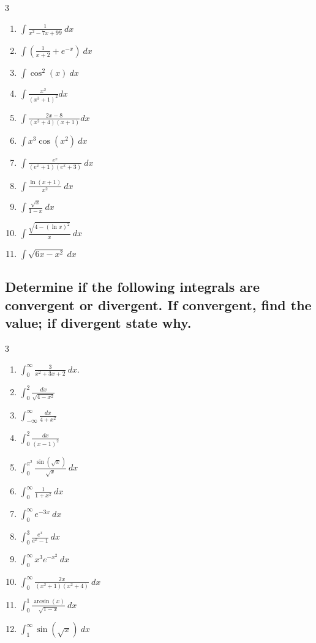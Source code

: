 \documentclass{article}
\begin{document}
\begin{multicols}{3}
\begin{enumerate}
\item $\displaystyle \int \frac{1}{x^2-7x+99}\ d x$
\item $\displaystyle \int\left( \frac{1}{x+2}+e^{-x}\right)\ d x$
\item $\displaystyle \int\cos^2(x)\ d x$
\item $\displaystyle \int\frac{x^2}{(x^3+1)^2} d x$
\item $\displaystyle \int\frac{2x-8}{(x^2+4)(x+1)} d x$
\item $\displaystyle \int x^3\cos(x^2)\ dx$
\item $\displaystyle \int \frac{e^x}{(e^x+1)(e^x+3)}\ dx$
\item $\displaystyle \int \frac{\ln(x+1)}{x^2}\ dx$
\item $\displaystyle \int \frac{\sqrt{x}}{1-x}\ dx$
\item $\displaystyle \int \frac{\sqrt{4-(\ln x)^2}}{x}\ dx$
\item $\displaystyle \int \sqrt{6x-x^2}\ dx$
\end{enumerate}
\end{multicols}


\subsection{Determine if the following integrals are convergent or divergent. If convergent, find the value; if divergent state why.}

\begin{multicols}{3}
\begin{enumerate}
\setlength{\itemsep}{0pt}
\item $\displaystyle \int_0^{\infty} \frac{3}{x^2+3x+2}\ dx$.
\item $\displaystyle \int_0^2 \frac{d x}{\sqrt{4-x^2}}$
\item $\displaystyle \int_{-\infty}^{\infty} \frac{d x}{4+x^2}$
\item $\displaystyle \int_0^2 \frac{d x}{(x-1)^2}$
\item $\displaystyle \int_0^{\pi^2} \frac{\sin (\sqrt{x})}{\sqrt{x}}\ d x$
\item $\displaystyle \int_0^{\infty} \frac{1}{1+x^2} \ d x$
\item $\displaystyle \int_0^{\infty} e^{-3x} \ d x$
\item $\displaystyle \int_0^{3} \frac{e^x}{e^x-1} \ d x$
\item $\displaystyle \int_0^{\infty} x^3 e^{-x^2}\ dx$
\item $\displaystyle \int_0^{\infty} \frac{2x}{(x^2+1)(x^2+4)}\ dx$
\item $\displaystyle \int_0^1 \frac{\arcsin(x)}{\sqrt{1-x}}\ dx$
\item $\displaystyle \int_1^{\infty} \sin(\sqrt{x})\ dx$

\end{enumerate}
\end{multicols}
\end{document}
